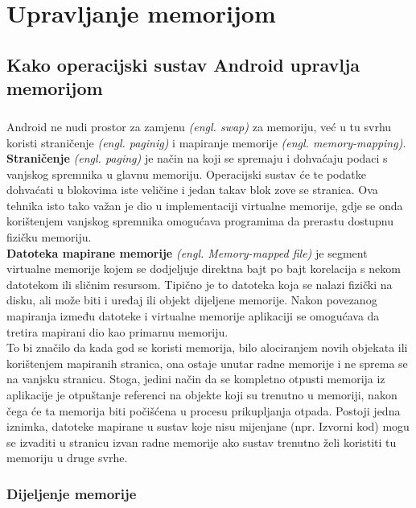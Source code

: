 \documentclass[times, utf8, zavrsni]{fer}
\begin{document}
\chapter{Upravljanje memorijom}
\section{Kako operacijski sustav Android upravlja memorijom}
\paragraph{}
Android ne nudi prostor za zamjenu \textit{(engl. swap)} za memoriju, već u tu svrhu koristi straničenje \textit{(engl. paginig)} i mapiranje memorije \textit{(engl. memory-mapping)}.\\

\textbf{Straničenje} \textit{(engl. paging)} je način na koji se spremaju i dohvaćaju podaci s vanjskog spremnika u glavnu memoriju. Operacijski sustav će te podatke dohvaćati u blokovima iste veličine i jedan takav blok zove se stranica. Ova tehnika isto tako važan je dio u implementaciji virtualne memorije, gdje se onda korištenjem vanjskog spremnika omogućava programima da prerastu dostupnu fizičku memoriju.\\

\textbf{Datoteka mapirane memorije} \textit{(engl. Memory-mapped file)} je segment virtualne memorije kojem se dodjeljuje direktna bajt po bajt korelacija s nekom datotekom ili sličnim resursom. Tipično je to datoteka koja se nalazi fizički na disku, ali može biti i uređaj ili objekt dijeljene memorije. Nakon povezanog mapiranja između datoteke i virtualne memorije aplikaciji se omogućava da tretira mapirani dio kao primarnu memoriju.\\

To bi značilo da kada god se koristi memorija, bilo alociranjem novih objekata ili korištenjem mapiranih stranica, ona ostaje unutar radne memorije i ne sprema se na vanjsku stranicu. Stoga, jedini način da se kompletno otpusti memorija iz aplikacije je otpuštanje referenci na objekte koji su trenutno u memoriji, nakon čega će ta memorija biti počišćena u procesu prikupljanja otpada. Postoji jedna iznimka, datoteke mapirane u sustav koje nisu mijenjane (npr. Izvorni kod) mogu se izvaditi u stranicu izvan radne memorije ako sustav trenutno želi koristiti tu memoriju u druge svrhe.

\subsection{Dijeljenje memorije}
\end{document}
